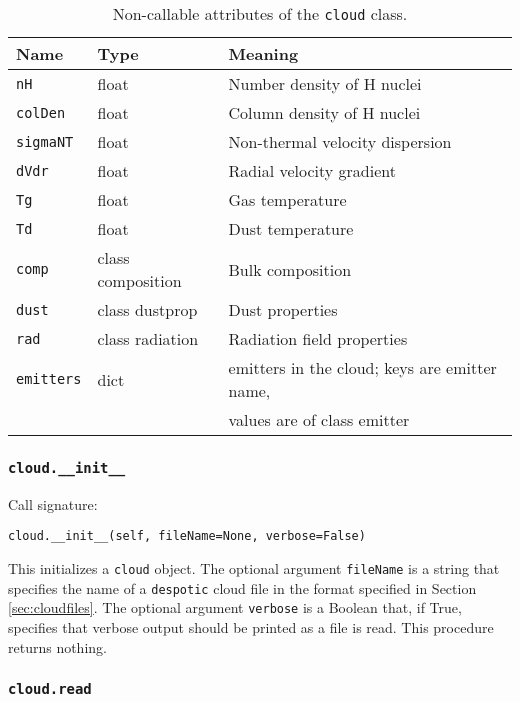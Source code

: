 \documentclass[12pt]{article}
\begin{document}
\begin{table}
\begin{center}
\begin{tabular}{lll}
\hline\hline
Name & Type & Meaning \\
\hline\hline
\texttt{nH} & float & Number density of H nuclei \\
\texttt{colDen} & float & Column density of H nuclei \\
\texttt{sigmaNT} & float & Non-thermal velocity dispersion \\
\texttt{dVdr} & float & Radial velocity gradient \\
\texttt{Tg} & float & Gas temperature \\
\texttt{Td} & float & Dust temperature \\
\texttt{comp} & class composition & Bulk composition \\
\texttt{dust} & class dustprop & Dust properties \\
\texttt{rad} & class radiation & Radiation field properties \\
\texttt{emitters} & dict & emitters in the cloud; keys are emitter name,\\
& & \qquad values are of class emitter \\
\hline
\end{tabular}
\caption{
\label{tab:cloudattr}
Non-callable attributes of the \texttt{cloud} class.
}
\end{center}
\end{table}

\subsubsection{\texttt{cloud.\_\_init\_\_}}

Call signature:

\begin{verbatim}
cloud.__init__(self, fileName=None, verbose=False)
\end{verbatim}

This initializes a \texttt{cloud} object. The optional argument \texttt{fileName} is a string that specifies the name of a \texttt{despotic} cloud file in the format specified in Section \ref{sec:cloudfiles}. The optional argument \texttt{verbose} is a Boolean that, if True, specifies that verbose output should be printed as a file is read. This procedure returns nothing.

\subsubsection{\texttt{cloud.read}}
\end{document}
